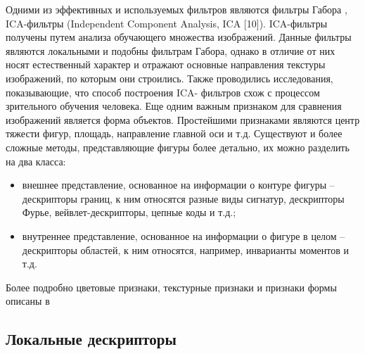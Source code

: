 Одними из эффективных и используемых фильтров являются фильтры Габора
, ICA-фильтры (Independent Component Analysis, ICA [10]). ICA-фильтры получены
путем анализа обучающего множества изображений. Данные фильтры являются
локальными и подобны фильтрам Габора, однако в отличие от них носят естественный
характер и отражают основные направления текстуры изображений, по которым они
строились. Также проводились исследования, показывающие, что способ построения ICA-
фильтров схож с процессом зрительного обучения человека.
Еще одним важным признаком для сравнения изображений является форма
объектов. Простейшими признаками являются центр тяжести фигур, площадь,
направление главной оси и т.д. Существуют и более сложные методы, представляющие
фигуры более детально, их можно разделить на два класса:
\begin{itemize}
\item  внешнее представление, основанное на информации о контуре фигуры –
дескрипторы границ, к ним относятся разные виды сигнатур, дескрипторы
Фурье, вейвлет-дескрипторы, цепные коды и т.д.;
\item  внутреннее представление, основанное на информации о фигуре в целом –
дескрипторы областей, к ним относятся, например, инварианты моментов и т.д.
\end{itemize}
Более подробно цветовые признаки, текстурные признаки и признаки формы описаны в
\subsection{Локальные дескрипторы}

